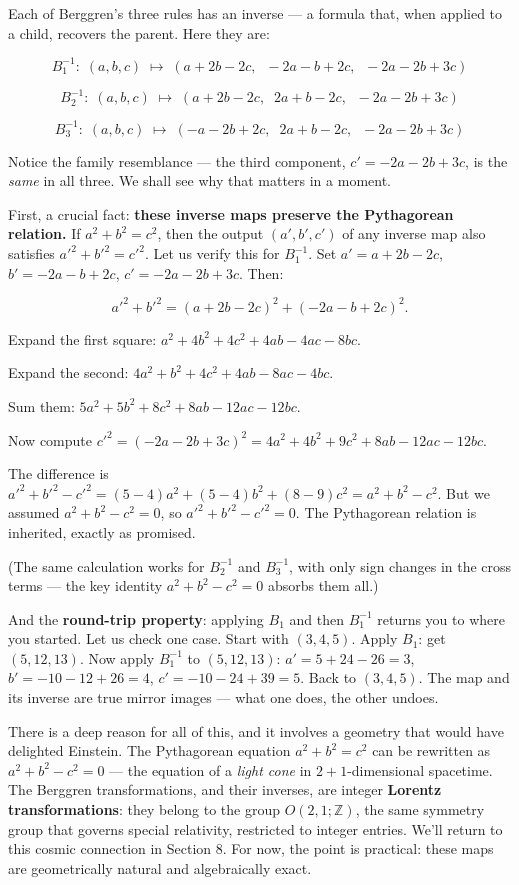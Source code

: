 \documentclass[11pt,openright,twoside]{book}
\theoremstyle{definition}
\begin{document}
Each of Berggren's three rules has an inverse --- a formula that, when applied to a child, recovers the parent. Here they are:

\[B_1^{-1}:\; (a,b,c) \;\longmapsto\; (a + 2b - 2c,\;\; -2a - b + 2c,\;\; -2a - 2b + 3c)\]

\[B_2^{-1}:\; (a,b,c) \;\longmapsto\; (a + 2b - 2c,\;\; 2a + b - 2c,\;\; -2a - 2b + 3c)\]

\[B_3^{-1}:\; (a,b,c) \;\longmapsto\; (-a - 2b + 2c,\;\; 2a + b - 2c,\;\; -2a - 2b + 3c)\]

Notice the family resemblance --- the third component, $c' = -2a - 2b + 3c$, is the \textit{same} in all three. We shall see why that matters in a moment.

First, a crucial fact: \textbf{these inverse maps preserve the Pythagorean relation.} If $a^2 + b^2 = c^2$, then the output $(a', b', c')$ of any inverse map also satisfies ${a'}^2 + {b'}^2 = {c'}^2$. Let us verify this for $B_1^{-1}$. Set $a' = a + 2b - 2c$, $b' = -2a - b + 2c$, $c' = -2a - 2b + 3c$. Then:

\[{a'}^2 + {b'}^2 = (a + 2b - 2c)^2 + (-2a - b + 2c)^2.\]

Expand the first square: $a^2 + 4b^2 + 4c^2 + 4ab - 4ac - 8bc$.

Expand the second: $4a^2 + b^2 + 4c^2 + 4ab - 8ac - 4bc$.

Sum them: $5a^2 + 5b^2 + 8c^2 + 8ab - 12ac - 12bc$.

Now compute ${c'}^2 = (-2a - 2b + 3c)^2 = 4a^2 + 4b^2 + 9c^2 + 8ab - 12ac - 12bc$.

The difference is ${a'}^2 + {b'}^2 - {c'}^2 = (5-4)a^2 + (5-4)b^2 + (8-9)c^2 = a^2 + b^2 - c^2$. But we assumed $a^2 + b^2 - c^2 = 0$, so ${a'}^2 + {b'}^2 - {c'}^2 = 0$. The Pythagorean relation is inherited, exactly as promised.

(The same calculation works for $B_2^{-1}$ and $B_3^{-1}$, with only sign changes in the cross terms --- the key identity $a^2 + b^2 - c^2 = 0$ absorbs them all.)

And the \textbf{round-trip property}: applying $B_1$ and then $B_1^{-1}$ returns you to where you started. Let us check one case. Start with $(3, 4, 5)$. Apply $B_1$: get $(5, 12, 13)$. Now apply $B_1^{-1}$ to $(5, 12, 13)$: $a' = 5 + 24 - 26 = 3$, $b' = -10 - 12 + 26 = 4$, $c' = -10 - 24 + 39 = 5$. Back to $(3, 4, 5)$. The map and its inverse are true mirror images --- what one does, the other undoes.

There is a deep reason for all of this, and it involves a geometry that would have delighted Einstein. The Pythagorean equation $a^2 + b^2 = c^2$ can be rewritten as $a^2 + b^2 - c^2 = 0$ --- the equation of a \textit{light cone} in $2+1$-dimensional spacetime. The Berggren transformations, and their inverses, are integer \textbf{Lorentz transformations}: they belong to the group $O(2,1;\mathbb{Z})$, the same symmetry group that governs special relativity, restricted to integer entries. We'll return to this cosmic connection in Section 8. For now, the point is practical: these maps are geometrically natural and algebraically exact.
\end{document}
